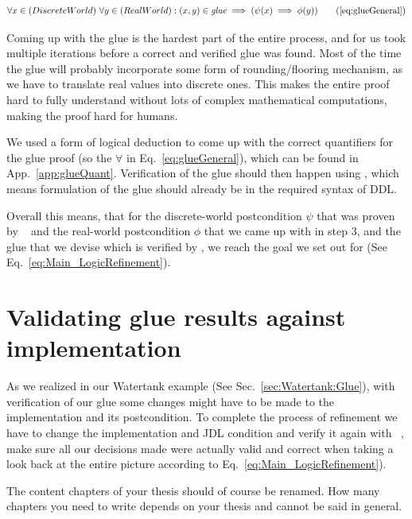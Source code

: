 \begin{equation}
	\centering
	\begin{split}
		\forall x \in (Discrete World)~\forall y \in (Real World):(x,y) \in \textit{glue} \implies (\psi(x) \implies \phi(y))
	\end{split}
	\tag{\ref{eq:glueGeneral}}
\end{equation}

Coming up with the glue is the hardest part of the entire process, and for us took multiple iterations before a correct and verified glue was found. Most of the time the glue will probably incorporate some form of rounding/flooring mechanism, as we have to translate real values into discrete ones. This makes the entire proof hard to fully understand without lots of complex mathematical computations, making the proof hard for humans.

We used a form of logical deduction to come up with the correct quantifiers for the glue proof (so the \(\forall\) in Eq.~\ref{eq:glueGeneral}), which can be found in App.~\ref{app:glueQuant}. Verification of the glue should then happen using \keym, which means formulation of the glue should already be in the required syntax of DDL.

Overall this means, that for the discrete-world postcondition \(\psi\) that was proven by \key~ and the real-world postcondition \(\phi\) that we came up with in step 3, and the glue that we devise which is verified by \keym, we reach the goal we set out for (See Eq.~\ref{eq:Main_LogicRefinement}).

\section{Validating glue results against implementation}
\label{sec:Process:Eval}

As we realized in our Watertank example (See Sec.~\ref{sec:Watertank:Glue}), with verification of our glue some changes might have to be made to the implementation and its postcondition. To complete the process of refinement we have to change the implementation and JDL condition and verify it again with \key~, make sure all our decisions made were actually valid and correct when taking a look back at the entire picture according to Eq.~\ref{eq:Main_LogicRefinement}).


\iffalse
The content chapters of your thesis should of course be renamed. How many
chapters you need to write depends on your thesis and cannot be said in general.

